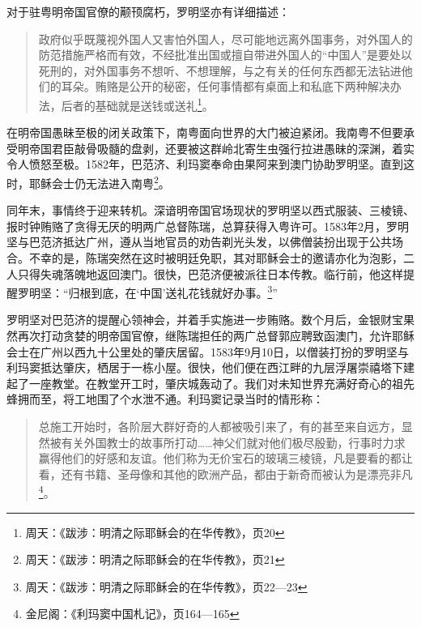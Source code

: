 对于驻粤明帝国官僚的颟顸腐朽，罗明坚亦有详细描述：

\begin{quote}

政府似乎既蔑视外国人又害怕外国人，尽可能地远离外国事务，对外国人的防范措施严格而有效，不经批准出国或擅自带进外国人的“中国人”是要处以死刑的，对外国事务不想听、不想理解，与之有关的任何东西都无法钻进他们的耳朵。贿赂是公开的秘密，任何事情都有桌面上和私底下两种解决办法，后者的基础就是送钱或送礼\footnote{周天：《跋涉：明清之际耶稣会的在华传教》，页20}。

\end{quote}

在明帝国愚昧至极的闭关政策下，南粤面向世界的大门被迫紧闭。我南粤不但要承受明帝国君臣敲骨吸髓的盘剥，还要被这群岭北寄生虫强行拉进愚昧的深渊，着实令人愤怒至极。1582年，巴范济、利玛窦奉命由果阿来到澳门协助罗明坚。直到这时，耶稣会士仍无法进入南粤\footnote{周天：《跋涉：明清之际耶稣会的在华传教》，页21}。

同年末，事情终于迎来转机。深谙明帝国官场现状的罗明坚以西式服装、三棱镜、报时钟贿赂了贪得无厌的明两广总督陈瑞，总算获得入粤许可。1583年2月，罗明坚与巴范济抵达广州，遵从当地官员的劝告剃光头发，以佛僧装扮出现于公共场合。不幸的是，陈瑞突然在这时被明廷免职，其对耶稣会士的邀请亦化为泡影，二人只得失魂落魄地返回澳门。很快，巴范济便被派往日本传教。临行前，他这样提醒罗明坚：“归根到底，在‘中国’送礼花钱就好办事。\footnote{周天：《跋涉：明清之际耶稣会的在华传教》，页22—23}”

罗明坚对巴范济的提醒心领神会，并着手实施进一步贿赂。数个月后，金银财宝果然再次打动贪婪的明帝国官僚，继陈瑞担任的两广总督郭应聘致函澳门，允许耶稣会士在广州以西九十公里处的肇庆居留。1583年9月10日，以僧装打扮的罗明坚与利玛窦抵达肇庆，栖居于一栋小屋。很快，他们便在西江畔的九层浮屠崇禧塔下建起了一座教堂。在教堂开工时，肇庆城轰动了。我们对未知世界充满好奇心的祖先蜂拥而至，将工地围了个水泄不通。利玛窦记录当时的情形称：

\begin{quote}
总施工开始时，各阶层大群好奇的人都被吸引来了，有的甚至来自远方，显然被有关外国教士的故事所打动……神父们就对他们极尽殷勤，行事时力求赢得他们的好感和友谊。他们称为无价宝石的玻璃三棱镜，凡是要看的都让看，还有书籍、圣母像和其他的欧洲产品，都由于新奇而被认为是漂亮非凡\footnote{金尼阁：《利玛窦中国札记》，页164—165}。

\end{quote}

